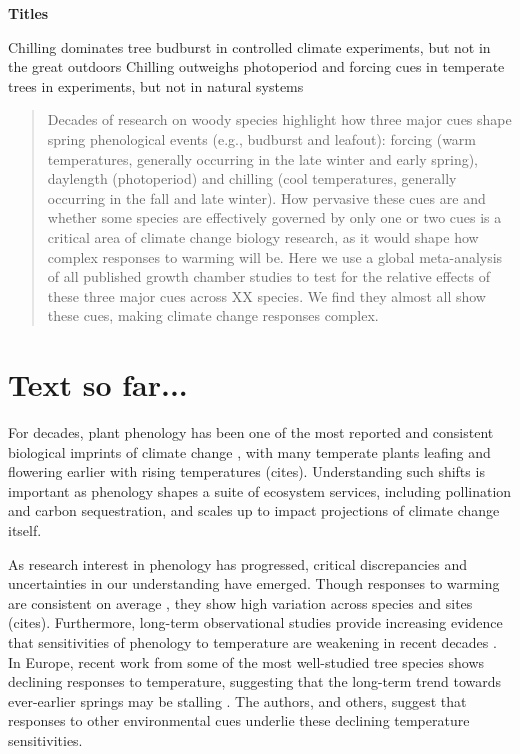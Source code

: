 \documentclass[11pt,letter]{article}
\begin{document}
%


\renewcommand{\refname}{\CHead{}}


{\bf Titles}

Chilling dominates tree budburst in controlled climate experiments, but not in the great outdoors
Chilling outweighs photoperiod and forcing cues in temperate trees in experiments, but not in natural systems


\begin{abstract}
Decades of research on woody species highlight how three major cues shape spring phenological events (e.g., budburst and leafout): forcing (warm temperatures, generally occurring in the late winter and early spring), daylength (photoperiod) and chilling (cool temperatures, generally occurring in the fall and late winter). How pervasive these cues are and whether some species are effectively governed by only one or two cues is a critical area of climate change biology research, as it would shape how complex responses to warming will be. Here we use a global meta-analysis of all published growth chamber studies to test for the relative effects of these three major cues across XX species. We find they almost all show these cues, making climate change responses complex. 
\end{abstract}

\section* {Text so far...}

\par For decades, plant phenology has been one of the most reported and consistent biological imprints of climate change \citep{IPCC:2014sm}, with many temperate plants leafing and flowering earlier with rising temperatures (cites). Understanding such shifts is important as phenology shapes a suite of ecosystem services, including pollination and carbon sequestration, and scales up to impact projections of climate change itself. 

\par As research interest in phenology has progressed, critical discrepancies and uncertainties in our understanding have emerged. Though responses to warming are consistent on average \citep{Wolkovich:2012n}, they show high variation across species and sites (cites). Furthermore, long-term observational studies provide increasing evidence that sensitivities of phenology to temperature are weakening in recent decades \citep{yu2010}. In Europe, recent work from some of the most well-studied tree species shows declining responses to temperature, suggesting that the long-term trend towards ever-earlier springs may be stalling \citep{fu2015}. The authors, and others, suggest that responses to other environmental cues underlie these declining temperature sensitivities.
\end{document}
